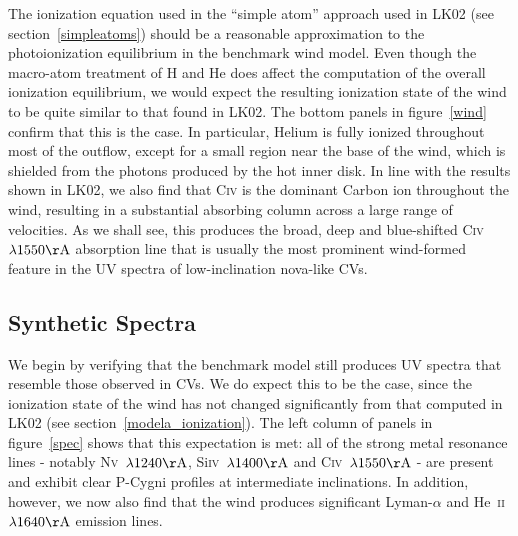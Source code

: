 \documentclass[preprint, a4paper, 11pt]{aastex}
\begin{document}
The ionization equation used in the ``simple atom'' approach used in
LK02 (see section~\ref{simpleatoms}) should be a reasonable approximation to
the photoionization equilibrium in the benchmark wind model. Even
though the macro-atom treatment of H and He does affect the 
computation of the overall ionization equilibrium, we would expect the
resulting ionization state of the wind to be quite similar to that
found in LK02. The bottom panels in figure~\ref{wind} confirm that this
is the case. In particular, Helium is fully ionized
throughout most of the outflow, except for a small region near the
base of the wind, which is shielded from the photons produced by the
hot inner disk. In line with the results shown in LK02, we also find
that C\textsc{iv} is the dominant Carbon ion throughout the wind,
resulting in a substantial absorbing column across a large range of
velocities. As we shall see, this produces the broad, deep and
blue-shifted C\textsc{iv}~$\lambda 1550{\rm \AA}$ absorption line that
is usually the most prominent wind-formed feature in the UV spectra of
low-inclination nova-like CVs.

\subsection{Synthetic Spectra}
\label{modela_spectrum}

We begin by verifying that the benchmark model still produces UV
spectra that resemble those observed in CVs. We do expect this to be
the case, since the ionization state of the wind has not changed
significantly from that computed in LK02 (see section~\ref{modela_ionization}). 
The left column of panels in figure~\ref{spec} shows that this expectation
is met: all of the strong metal resonance
lines - notably N\textsc{v}~$\lambda 1240{\rm \AA}$,
Si\textsc{iv}~$\lambda 1400{\rm \AA}$ and C\textsc{iv}~$\lambda
1550{\rm \AA}$ - are present and exhibit clear P-Cygni profiles
at intermediate inclinations. In addition, however, we now also find
that the wind produces significant Lyman-$\alpha$ and
He~\textsc{ii}~$\lambda1640{\rm \AA}$ emission lines. 
\end{document}
